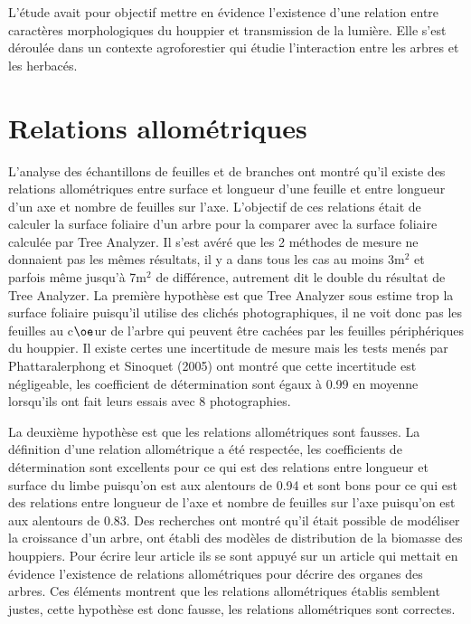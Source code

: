 \documentclass[12pt]{report}
\begin{document}
L'étude avait pour objectif mettre en évidence l'existence d'une relation entre
caractères morphologiques du houppier et transmission de la lumière. Elle s'est
déroulée dans un contexte agroforestier qui étudie l'interaction entre les
arbres et les herbacés.

\section{Relations allométriques}

L'analyse des échantillons de feuilles et de branches ont montré qu'il existe
des relations allométriques entre surface et longueur d'une feuille et entre
longueur d'un axe et nombre de feuilles sur l'axe. L'objectif de ces relations
était de calculer la surface foliaire d'un arbre pour la comparer avec la
surface foliaire calculée par Tree Analyzer. Il s'est avéré que les 2 méthodes de
mesure ne donnaient pas les mêmes résultats, il y a dans tous les cas au moins
3m$^{2}$ et parfois même jusqu'à 7m$^{2}$ de différence, autrement dit le double
du résultat de Tree Analyzer. La première hypothèse est que Tree Analyzer sous
estime trop la surface foliaire puisqu'il utilise des clichés photographiques, il
ne voit donc pas les feuilles au c$\oe$ur de l'arbre qui peuvent être cachées
par les feuilles périphériques du houppier. Il existe certes une incertitude de
mesure mais les tests menés par Phattaralerphong et Sinoquet (2005) ont montré
que cette incertitude est négligeable, les coefficient de détermination sont
égaux à 0.99 en moyenne lorsqu'ils ont fait leurs essais avec 8 photographies.

La deuxième hypothèse est que les relations allométriques sont fausses. La
définition d'une relation allométrique
a été respectée, les coefficients de détermination sont excellents pour ce qui
est des relations entre longueur et surface du limbe puisqu'on est aux alentours
de 0.94 et sont bons pour ce qui est des relations entre longueur de l'axe et
nombre de feuilles sur l'axe puisqu'on est aux alentours de 0.83. Des recherches
ont montré qu'il était possible de modéliser la croissance d'un arbre,
\citet{MAR_ref41} ont établi des modèles de distribution de la biomasse des
houppiers. Pour écrire leur article ils se sont appuyé sur un article qui
mettait en évidence l'existence de relations allométriques pour décrire des
organes des arbres. Ces éléments montrent que les relations allométriques
établis semblent justes, cette hypothèse est donc fausse, les relations
allométriques sont correctes.
\end{document}
